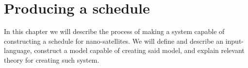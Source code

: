 \chapter{Producing a schedule} \label{cha:analysis}
In this chapter we will describe the process of making a system capable of constructing a schedule for nano-satellites. We will define and describe an input-language, construct a model capable of creating said model, and explain relevant theory for creating such system.








